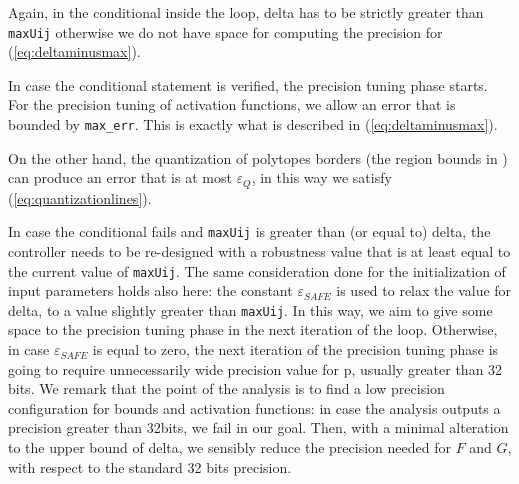 Again, in the conditional inside the loop, delta has to be strictly greater than \texttt{maxUij} otherwise we do not have space for computing the precision for (\ref{eq:deltaminusmax}).

In case the conditional statement is verified,
the precision tuning phase starts.
For the precision tuning of activation functions, we allow an error that is bounded by \texttt{max\_err}. This is exactly what is described in (\ref{eq:deltaminusmax}).

On the other hand, the quantization of polytopes borders (the region bounds in \statespace) can produce an error that is at most $\varepsilon_{Q}$, in this way we satisfy 
(\ref{eq:quantizationlines}).

In case the conditional fails and \texttt{maxUij} is greater than (or equal to) delta, the controller needs to be re-designed with a robustness value that is at least equal to the current value of \texttt{maxUij}. The same consideration done for the initialization of input parameters holds also here: the constant $\varepsilon_{SAFE}$ is used to relax the value for delta, to a value slightly greater than \texttt{maxUij}. In this way, we aim to give some space to the precision tuning phase in the next iteration of the loop. Otherwise, in case $\varepsilon_{SAFE}$ is equal to zero, the next iteration of the precision tuning phase is going to require unnecessarily wide precision value for p, usually greater than 32 bits. 
We remark that the point of the analysis is to find a low precision configuration for bounds and activation functions: in case the analysis outputs a precision greater than 32bits, we fail in our goal.
Then, with a minimal alteration to the upper bound of delta, we sensibly reduce the precision needed for $F$ and $G$, with respect to the standard 32 bits precision.


